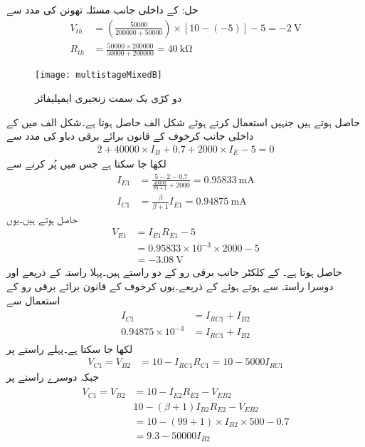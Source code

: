 حل: کے داخلی جانب مسئلہ تھونن کی مدد سے
\begin{align*}
V_{th}&=\left(\frac{50000}{200000+50000}\right) \times \left[10-\left(-5 \right) \right]-5=\SI{-2}{\volt}\\
R_{th}&=\frac{50000 \times 200000}{50000+200000}=\SI{40}{\kilo \ohm}
\end{align*} 
\begin{figure}
\centering
\texttt{[image: multistageMixedB]}
\caption{دو کڑی یک سمت زنجیری ایمپلیفائر}
\label{شکل_دو_کڑی_زنجیری_یکسمتی_ایمپلیفائر_مثبت_منفی_مثبت_الف}
\end{figure}
حاصل ہوتے ہیں جنہیں استعمال کرتے ہوئے شکل  الف حاصل ہوتا ہے۔شکل  الف میں  کے داخلی جانب کرخوف کے قانون برائے برقی دباو کی مدد سے
\begin{align*}
2+40000\times I_B+0.7+2000\times I_E-5=0
\end{align*}
لکھا جا سکتا ہے جس میں  پُر کرنے سے
\begin{align*}
I_{E1}&=\frac{5-2-0.7}{\frac{40000}{99+1}+2000}=\SI{0.95833}{\milli \ampere}\\
I_{C1}&=\frac{\beta}{\beta+1} I_{E1}=\SI{0.94875}{\milli \ampere}
\end{align*}
حاصل ہوتے ہیں۔یوں 
\begin{align*}
V_{E1}&=I_{E1} R_{E1}-5\\
&=0.95833 \times 10^{-3} \times 2000-5\\
&=\SI{-3.08}{\volt}
\end{align*}
حاصل ہوتا ہے۔ کے کلکٹر  جانب برقی رو  کے دو راستے ہیں۔پہلا راستہ  کے ذریعے اور دوسرا راستہ  سے ہوتے ہوئے  کے ذریعے۔یوں کرخوف کے قانون برائے برقی رو کے استعمال سے
\begin{gather}
\begin{aligned}\label{مساوات_ٹرانزسٹر_مثال_زنجیری_مکس_پہلا}
I_{C1}&=I_{RC1}+I_{B2}\\
0.94875 \times 10^{-3}&=I_{RC1}+I_{B2}
\end{aligned}
\end{gather}
لکھا جا سکتا ہے۔پہلے راستے پر
\begin{align}\label{مساوات_ٹرانزسٹر_مثال_زنجیری_مکس_دوسرا}
V_{C1}=V_{B2}&=10-I_{RC1} R_{C1}=10-5000 I_{RC1}
\end{align}
جبکہ دوسرے راستے پر
\begin{gather}\label{مساوات_ٹرانزسٹر_مثال_زنجیری_مکس_تیسرا}
\begin{aligned}
V_{C1}=V_{B2}&=10-I_{E2}R_{E2}-V_{EB2}\\
&10-\left(\beta+1 \right)I_{B2}R_{E2}-V_{EB2}\\
&=10-\left(99+1 \right) \times I_{B2} \times 500-0.7\\
&=9.3-50000 I_{B2}
\end{aligned}
\end{gather}
